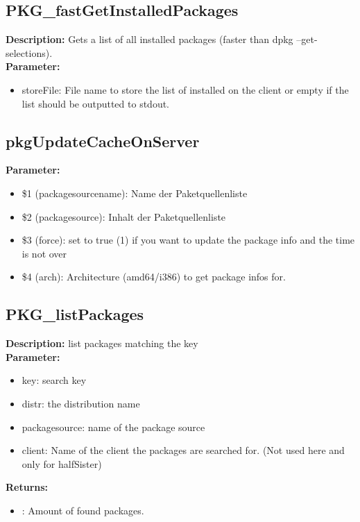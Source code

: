 \subsection{PKG\_fastGetInstalledPackages}
\textbf{Description:} Gets a list of all installed packages (faster than dpkg --get-selections).\\
\textbf{Parameter:}
\begin{itemize}
\item storeFile: File name to store the list of installed on the client or empty if the list should be outputted to stdout.
\end{itemize}

\subsection{pkgUpdateCacheOnServer}
\textbf{Parameter:}
\begin{itemize}
\item \$1 (packagesourcename): Name der Paketquellenliste
\item \$2 (packagesource): Inhalt der Paketquellenliste
\item \$3 (force): set to true (1) if you want to update the package info and the time is not over
\item \$4 (arch): Architecture (amd64/i386) to get package infos for.
\end{itemize}

\subsection{PKG\_listPackages}
\textbf{Description:} list packages matching the key\\
\textbf{Parameter:}
\begin{itemize}
\item key: search key
\item distr: the distribution name
\item packagesource: name of the package source
\item client: Name of the client the packages are searched for. (Not used here and only for halfSister)
\end{itemize}
\textbf{Returns:}
\begin{itemize}
\item : Amount of found packages.
\end{itemize}

